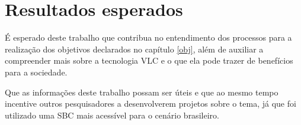 \chapter{Resultados esperados}

É esperado deste trabalho que contribua no entendimento dos processos para a realização dos objetivos declarados no capítulo \ref{obj}, além de auxiliar a compreender mais sobre a tecnologia VLC e o que ela pode trazer de benefícios para a sociedade.

Que as informações deste trabalho possam ser úteis e que ao mesmo tempo incentive outros pesquisadores a desenvolverem projetos sobre o tema, já que foi utilizado uma SBC mais acessível para o cenário brasileiro.

